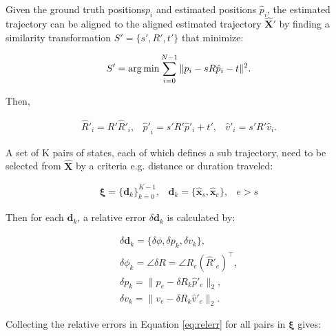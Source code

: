 \begin{inparaenum}[Step 1.]
	\item Given the ground truth positions$ {{{p}_i}} $ and estimated positions ${{\hat{p}}_i}$, the estimated trajectory can be aligned to the aligned estimated trajectory $\bm{\hat{X}}'$ by finding a similarity transformation $S'=\{s', {R}', {t}'\}$ that minimize:
	
	\begin{equation}
	S'=\operatorname*{arg\,min}{\sum_{i=0}^{N-1}{\|{p}_i-sR{\hat{p}_i}-t\|^{2}}}.
	\end{equation}
	
	Then,
	
	\begin{equation}
	\begin{array}{lll}
		\hat{R}'_i=R'\hat{R}'_i,&  {\hat{p}'}_i=s'R'\hat{{p}}'_i+t',  & \hat{v}'_i=s'R'\hat{v}_i.
	\end{array}
	\end{equation}
	
	\item A set of K pairs of states, each of which defines a sub trajectory, need to be selected from $\hat{\bm{X}}$ by a criteria e.g. distance or duration traveled:
	
	\begin{equation}
	\begin{array}{lll}
	\bm{\xi}=\{\bm{d}_k\}_{k=0}^{K-1}, & \bm{d}_k=\{\bm{\hat{x}}_s, \bm{\hat{x}}_e\}, & e>s
	\end{array}
	\end{equation}
	
	\item Then for each $\bm{d}_k$, a relative error $\delta{\bm{d}_k}$  is calculated by:
	
	\begin{equation}
	\begin{array}{l}
	\delta{\bm{d}_k}=\{\delta{\phi}, \delta{p_k}, \delta{v_k}\}, \\
	\delta\phi_k=\angle \delta R=\angle R_e(\hat{R}'_e)^\top, \\
	\delta{p_k}=\|{p_e-\delta R_k\hat{p}'_e}\|_2, \\
	\delta{v_k}=\|v_e-\delta R_k \hat{v}'_e\|_2.
	\end{array}
	\label{eq:relerr}
	\end{equation}
	
	\item Collecting the relative errors in Equation \ref{eq:relerr} for all pairs in $\bm{\xi}$ gives:
	

\end{inparaenum}
